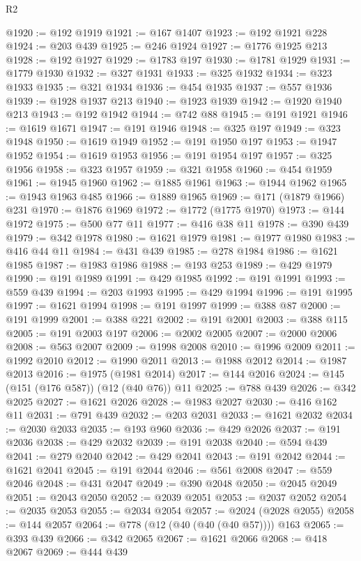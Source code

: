 \begin{lexlean}{R2}
\begin{coremodule}
@1920 := @192 @1919
@1921 := @167 @1407
@1923 := @192 @1921 @228
@1924 := @203 @439
@1925 := @246 @1924
@1927 := @1776 @1925 @213
@1928 := @192 @1927
@1929 := @1783 @197
@1930 := @1781 @1929
@1931 := @1779 @1930
@1932 := @327 @1931
@1933 := @325 @1932
@1934 := @323 @1933
@1935 := @321 @1934
@1936 := @454 @1935
@1937 := @557 @1936
@1939 := @1928 @1937 @213
@1940 := @1923 @1939
@1942 := @1920 @1940 @213
@1943 := @192 @1942
@1944 := @742 @88
@1945 := @191 @1921
@1946 := @1619 @1671
@1947 := @191 @1946
@1948 := @325 @197
@1949 := @323 @1948
@1950 := @1619 @1949
@1952 := @191 @1950 @197
@1953 := @1947 @1952
@1954 := @1619 @1953
@1956 := @191 @1954 @197
@1957 := @325 @1956
@1958 := @323 @1957
@1959 := @321 @1958
@1960 := @454 @1959
@1961 := @1945 @1960
@1962 := @1885 @1961
@1963 := @1944 @1962
@1965 := @1943 @1963 @485
@1966 := @1889 @1965
@1969 := @171 (@1879 @1966) @231
@1970 := @1876 @1969
@1972 := @1772 (@1775 @1970)
@1973 := @144 @1972
@1975 := @500 @77 @11
@1977 := @416 @38 @11
@1978 := @390 @439
@1979 := @342 @1978
@1980 := @1621 @1979
@1981 := @1977 @1980
@1983 := @416 @44 @11
@1984 := @431 @439
@1985 := @278 @1984
@1986 := @1621 @1985
@1987 := @1983 @1986
@1988 := @193 @253
@1989 := @429 @1979
@1990 := @191 @1989
@1991 := @429 @1985
@1992 := @191 @1991
@1993 := @559 @439
@1994 := @203 @1993
@1995 := @429 @1994
@1996 := @191 @1995
@1997 := @1621 @1994
@1998 := @191 @1997
@1999 := @388 @87
@2000 := @191 @1999
@2001 := @388 @221
@2002 := @191 @2001
@2003 := @388 @115
@2005 := @191 @2003 @197
@2006 := @2002 @2005
@2007 := @2000 @2006
@2008 := @563 @2007
@2009 := @1998 @2008
@2010 := @1996 @2009
@2011 := @1992 @2010
@2012 := @1990 @2011
@2013 := @1988 @2012
@2014 := @1987 @2013
@2016 := @1975 (@1981 @2014)
@2017 := @144 @2016
@2024 := @145 (@151 (@176 @587)) (@12 (@40 @76)) @11
@2025 := @788 @439
@2026 := @342 @2025
@2027 := @1621 @2026
@2028 := @1983 @2027
@2030 := @416 @162 @11
@2031 := @791 @439
@2032 := @203 @2031
@2033 := @1621 @2032
@2034 := @2030 @2033
@2035 := @193 @960
@2036 := @429 @2026
@2037 := @191 @2036
@2038 := @429 @2032
@2039 := @191 @2038
@2040 := @594 @439
@2041 := @279 @2040
@2042 := @429 @2041
@2043 := @191 @2042
@2044 := @1621 @2041
@2045 := @191 @2044
@2046 := @561 @2008
@2047 := @559 @2046
@2048 := @431 @2047
@2049 := @390 @2048
@2050 := @2045 @2049
@2051 := @2043 @2050
@2052 := @2039 @2051
@2053 := @2037 @2052
@2054 := @2035 @2053
@2055 := @2034 @2054
@2057 := @2024 (@2028 @2055)
@2058 := @144 @2057
@2064 := @778 (@12 (@40 (@40 (@40 @57)))) @163
@2065 := @393 @439
@2066 := @342 @2065
@2067 := @1621 @2066
@2068 := @418 @2067
@2069 := @444 @439

\end{coremodule}
\end{lexlean}
